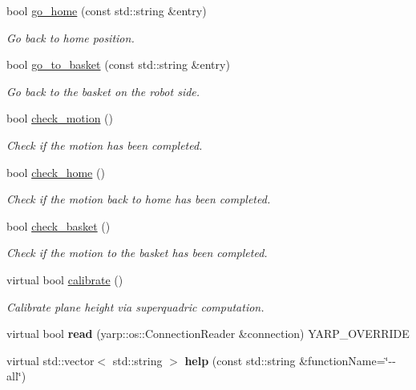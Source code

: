 \begin{DoxyCompactItemize}
\item 
bool \hyperlink{classGraspingModule_a1455fc4c6a1ae5690fa691cc324fec4e}{go\+\_\+home} (const std\+::string \&entry)
\begin{DoxyCompactList}\small\item\em Go back to home position. \end{DoxyCompactList}\item 
bool \hyperlink{classGraspingModule_a75482819f7f289b3f456571628952122}{go\+\_\+to\+\_\+basket} (const std\+::string \&entry)
\begin{DoxyCompactList}\small\item\em Go back to the basket on the robot side. \end{DoxyCompactList}\item 
bool \hyperlink{classGraspingModule_a91eac72e632f224442f34b907e479fa3}{check\+\_\+motion} ()
\begin{DoxyCompactList}\small\item\em Check if the motion has been completed. \end{DoxyCompactList}\item 
bool \hyperlink{classGraspingModule_a650c026153e3a7b0044f508cf9d4bf00}{check\+\_\+home} ()
\begin{DoxyCompactList}\small\item\em Check if the motion back to home has been completed. \end{DoxyCompactList}\item 
bool \hyperlink{classGraspingModule_a19ee1967a83d1412f9125ec482ce80bd}{check\+\_\+basket} ()
\begin{DoxyCompactList}\small\item\em Check if the motion to the basket has been completed. \end{DoxyCompactList}\item 
virtual bool \hyperlink{classsuperquadricGrasp__IDL_ac40ef7c0dd4f0e3600db9aea5cc5c298}{calibrate} ()
\begin{DoxyCompactList}\small\item\em Calibrate plane height via superquadric computation. \end{DoxyCompactList}\item 
virtual bool {\bfseries read} (yarp\+::os\+::\+Connection\+Reader \&connection) Y\+A\+R\+P\+\_\+\+O\+V\+E\+R\+R\+I\+DE\label{classsuperquadricGrasp__IDL_a710271cfee0c9b1a31707d84f194b69b}

\item 
virtual std\+::vector$<$ std\+::string $>$ {\bfseries help} (const std\+::string \&function\+Name=\char`\"{}-\/-\/all\char`\"{})\label{classsuperquadricGrasp__IDL_a226f766d3a3a0ba87e7c1fa0aceb2cb8}

\end{DoxyCompactItemize}
